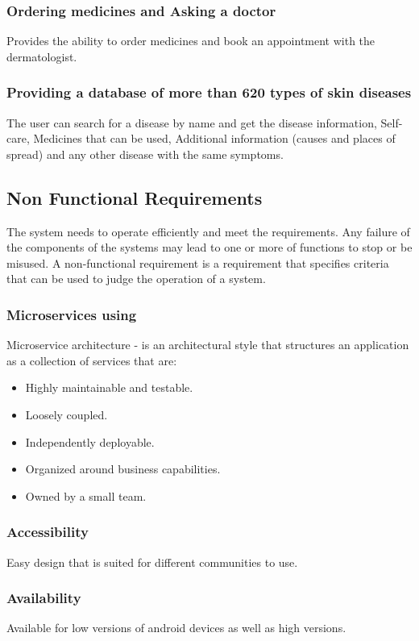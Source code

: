 \subsubsection{Ordering medicines and Asking a doctor}
Provides the ability to order medicines and book an appointment with the dermatologist.
\subsubsection{Providing a database of more than 620 types of skin diseases}
The user can search for a disease by name and get the disease information, Self-care, Medicines that can be used, Additional information (causes and places of spread) and any other disease with the same symptoms.
\subsection{Non Functional Requirements}
The system needs to operate efficiently and meet the requirements. Any failure of the components of the systems may lead to one or more of functions to stop or be misused. A non-functional requirement is a requirement that specifies criteria that can be used to judge the operation of a system.

\subsubsection{Microservices using}Microservice architecture - is an architectural style that structures an application as a collection of services that are:
\begin{itemize}
	\item Highly maintainable and testable.
	\item Loosely coupled.
	\item Independently deployable.
	\item Organized around business capabilities.
	\item Owned by a small team.
\end{itemize}

\subsubsection{Accessibility}Easy design that is suited for different communities to use.
\subsubsection{Availability}Available for low versions of android devices as well as high versions.
